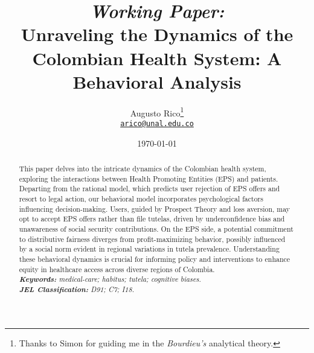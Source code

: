 \documentclass[12pt]{article}
\title{\textit{Working Paper:} \\ %
Unraveling the Dynamics of the Colombian Health System: A Behavioral Analysis %
}
\author{Augusto Rico\thanks{Thanks to Simon for guiding me in the \textit{Bourdieu's} analytical theory.}\\
    \href{mailto:arico@unal.edu.co}{\texttt{arico@unal.edu.co}}
    }
\date{\today}
\begin{document}
{ %
\maketitle
\begin{abstract}
    This paper delves into the intricate dynamics of the Colombian health system, exploring the interactions between Health Promoting Entities (EPS) and patients. Departing from the rational model, which predicts user rejection of EPS offers and resort to legal action, our behavioral model incorporates psychological factors influencing decision-making. Users, guided by Prospect Theory and loss aversion, may opt to accept EPS offers rather than file tutelas, driven by underconfidence bias and unawareness of social security contributions. On the EPS side, a potential commitment to distributive fairness diverges from profit-maximizing behavior, possibly influenced by a social norm evident in regional variations in tutela prevalence. Understanding these behavioral dynamics is crucial for informing policy and interventions to enhance equity in healthcare access across diverse regions of Colombia.
~\\
\textit{\textbf{Keywords: }%
medical-care; habitus; tutela; cognitive biases.} \\ %
\textit{\textbf{JEL Classification: }%
D91; C7; I18.} %
\end{abstract}}



{\let\thefootnote\relax{}}
\end{document}
